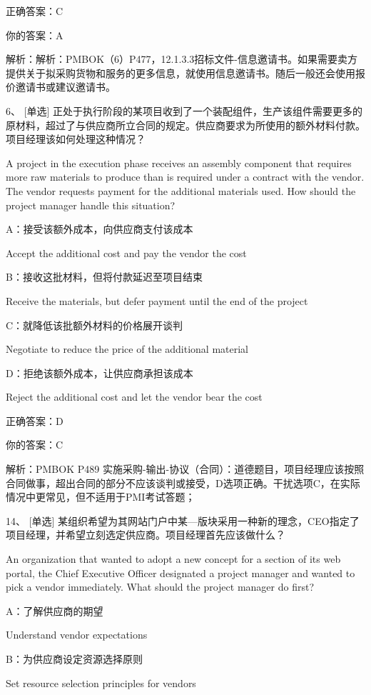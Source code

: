 正确答案：C

你的答案：A

解析：解析：PMBOK（6）P477，12.1.3.3招标文件-信息邀请书。如果需要卖方提供关于拟采购货物和服务的更多信息，就使用信息邀请书。随后一般还会使用报价邀请书或建议邀请书。

6、 [单选] 正处于执行阶段的某项目收到了一个装配组件，生产该组件需要更多的原材料，超过了与供应商所立合同的规定。供应商要求为所使用的额外材料付款。项目经理该如何处理这种情况？

A project in the execution phase receives an assembly component that requires more raw materials to produce than is required under a contract with the vendor. The vendor requests payment for the additional materials used. How should the project manager handle this situation?

A：接受该额外成本，向供应商支付该成本

Accept the additional cost and pay the vendor the cost

B：接收这批材料，但将付款延迟至项目结束

Receive the materials, but defer payment until the end of the project

C：就降低该批额外材料的价格展开谈判

Negotiate to reduce the price of the additional material

D：拒绝该额外成本，让供应商承担该成本

Reject the additional cost and let the vendor bear the cost

正确答案：D

你的答案：C

解析：PMBOK P489 实施采购-输出-协议（合同）：道德题目，项目经理应该按照合同做事，超出合同的部分不应该谈判或接受，D选项正确。干扰选项C，在实际情况中更常见，但不适用于PMI考试答题；



14、 [单选] 某组织希望为其网站门户中某—版块采用一种新的理念，CEO指定了项目经理，并希望立刻选定供应商。项目经理首先应该做什么？

An organization that wanted to adopt a new concept for a section of its web portal, the Chief Executive Officer designated a project manager and wanted to pick a vendor immediately. What should the project manager do first?

A：了解供应商的期望

Understand vendor expectations

B：为供应商设定资源选择原则

Set resource selection principles for vendors

